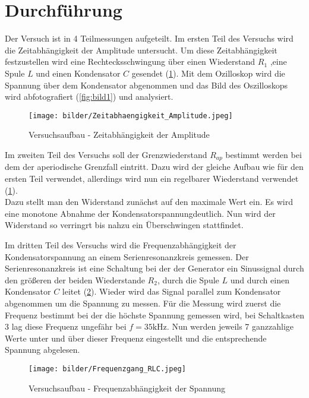 \newpage
\section{Durchführung}
\label{sec:Durchfuehrung}
Der Versuch ist in 4 Teilmessungen aufgeteilt.
Im ersten Teil des Versuchs wird die Zeitabhängigkeit der Amplitude untersucht.
Um diese Zeitabhängigkeit festzustellen wird eine Rechtecksschwingung über einen Wiederstand $R_1$ ,eine Spule $L$ und einen Kondensator $C$ gesendet (\ref{fig:Aufbau1}).
Mit dem Ozilloskop wird die Spannung über dem Kondensator abgenommen und das Bild des Oszilloskops wird abfotografiert (\ref{fig:bild1}) und analysiert.
\begin{figure}
    \centering
    \texttt{[image: bilder/Zeitabhaengigkeit\_Amplitude.jpeg]}
    \caption{Versuchsaufbau - Zeitabhängigkeit der Amplitude \cite[294]{Anleitung}}
    \label{fig:Aufbau1}
\end{figure}

Im zweiten Teil des Versuchs soll der Grenzwiederstand $R_{ap}$ bestimmt werden bei dem der aperiodische Grenzfall eintritt.
Dazu wird der gleiche Aufbau wie für den ersten Teil verwendet, allerdings wird nun ein regelbarer Wiederstand 
verwendet (\ref{fig:Aufbau1}).\\
Dazu stellt man den Widerstand zunächst auf den maximale Wert ein. Es wird eine monotone Abnahme der Kondensatorspannungdeutlich.
Nun wird der Widerstand so verringrt bis nahzu ein Überschwingen stattfindet.     

Im dritten Teil des Versuchs wird die Frequenzabhängigkeit der Kondensatorspannung an einem Serienresonanzkreis gemessen.
Der Serienresonanzkreis ist eine Schaltung bei der  der Generator ein Sinussignal durch den größeren der beiden Wiederstande $R_2$, durch die Spule $L$ und durch einen Kondensator $C$ leitet (\ref{fig:Aufbau2}).
Wieder wird das Signal parallel zum Kondensator abgenommen um die Spannung zu messen.
Für die Messung wird zuerst die Frequenz bestimmt bei der die höchste Spannung gemessen wird, bei Schaltkasten 3 lag diese Frequenz ungefähr bei $f = 35 \text{kHz}$.
Nun werden jeweils 7 ganzzahlige Werte unter und über dieser Frequenz eingestellt und die entsprechende Spannung abgelesen.
\begin{figure}
    \centering
    \texttt{[image: bilder/Frequenzgang\_RLC.jpeg]}
    \caption{Versuchsaufbau - Frequenzabhängigkeit der Spannung \cite[295]{Anleitung}}
    \label{fig:Aufbau2}
\end{figure}

